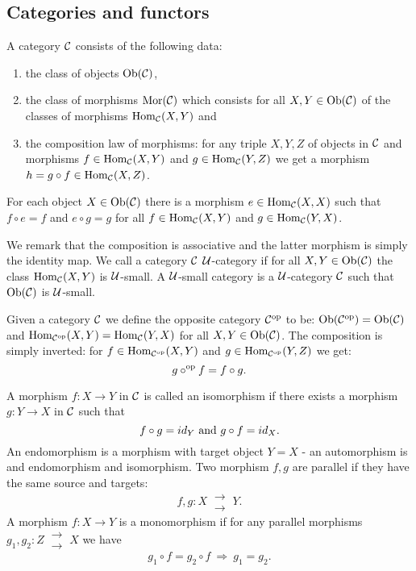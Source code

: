 \subsection{Categories and functors}
\begin{defi}
A category $\mathcal{C}$ consists of the following data:
\begin{enumerate}
\item the class of objects $\mathrm{Ob}(\mathcal{C})$,
\item the class of morphisms $\mathrm{Mor}(\mathcal{C})$ which consists for all $X, Y \in \mathrm{Ob}(\mathcal{C})$ of the classes of morphisms $\mathrm{Hom}_{\mathcal{C}}(X,Y)$ and 
\item the composition law of morphisms: for any triple $X, Y, Z$ of objects in $\mathcal{C}$ and morphisms $f \in \mathrm{Hom}_{\mathcal{C}}(X,Y)$ and $g \in \mathrm{Hom}_{\mathcal{C}}(Y,Z)$ we get a morphism $h = g \circ f \in \mathrm{Hom}_{\mathcal{C}}(X,Z)$.
\end{enumerate}
For each object $X \in \mathrm{Ob}(\mathcal{C})$ there is a morphism $e \in \mathrm{Hom}_{\mathcal{C}}(X,X)$ such that $f \circ e = f$ and $e \circ g = g$ for all $f \in \mathrm{Hom}_{\mathcal{C}}(X,Y)$ and $g \in \mathrm{Hom}_{\mathcal{C}}(Y,X)$.
\end{defi}
We remark that the composition is associative and the latter morphism is simply the identity map. We call a category $\mathcal{C}$ $\mathcal{U}$-category if for all $X, Y \in \mathrm{Ob}(\mathcal{C})$ the class $\mathrm{Hom}_{\mathcal{C}}(X,Y)$ is $\mathcal{U}$-small. A $\mathcal{U}$-small category is a $\mathcal{U}$-category $\mathcal{C}$ such that $\mathrm{Ob}(\mathcal{C})$ is $\mathcal{U}$-small.
\begin{defi}
Given a category $\mathcal{C}$ we define the opposite category $\mathcal{C}^{\mathrm{op}}$ to be:
$\mathrm{Ob}(\mathcal{C}^{\mathrm{op}}) = \mathrm{Ob}(\mathcal{C})$ and $\mathrm{Hom}_{\mathcal{C}^{\mathrm{op}}}(X,Y) = \mathrm{Hom}_{\mathcal{C}}(Y,X)$ for all $X, Y \in \mathrm{Ob}(\mathcal{C})$.
The composition is simply inverted: for $f \in \mathrm{Hom}_{\mathcal{C}^{\mathrm{op}}}(X,Y)$ and $g \in \mathrm{Hom}_{\mathcal{C}^{\mathrm{op}}}(Y,Z)$ we get:
$$g \circ^{\mathrm{op}} f = f \circ g.$$
\end{defi}
A morphism $f : X \longrightarrow Y$ in $\mathcal{C}$ is called an isomorphism if there exists a morphism $g : Y \longrightarrow X$ in $\mathcal{C}$ such that
$$ f \circ g = id_Y  \ \mathrm{and}\ g \circ f = id_X.$$
An endomorphism is a morphism with target object $Y = X$ - an automorphism is and endomorphism and isomorphism. Two morphism $f, g$ are parallel if they have the same source and targets:
$$f, g : X\  \substack{\longrightarrow\\\longrightarrow}\ Y.$$
A morphism $f : X \longrightarrow Y$ is a monomorphism if for any parallel morphisms $g_1 , g_2 : Z\  \substack{\longrightarrow\\\longrightarrow}\ X$ we have
$$g_1 \circ f = g_2 \circ f\ \Rightarrow\ g_1 = g_2.$$
